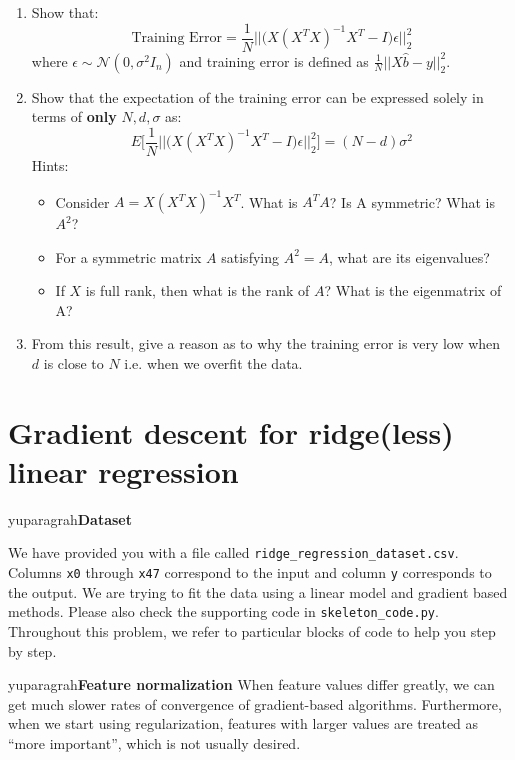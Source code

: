 \documentclass{article}
\begin{document}
\begin{enumerate}
  
  \item Show that: 
    $$
    \textrm{Training Error} = \frac{1}{N} \Big|\Big| \Big( X(X^TX)^{-1}X^T - I \Big) \epsilon \Big| \Big|^2_2
    $$
    where $\epsilon \sim \mathcal{N}(0, \sigma^2 I_n)$ and training error is defined as $\frac{1}{N}||X\hat{b} - y||_2^2$. 

  \item Show that the expectation of the training error can be expressed solely in terms of \textbf{only} $N, d, \sigma$ as:
  $$
  E \Big[ \frac{1}{N} \Big|\Big| \Big( X(X^TX)^{-1}X^T - I \Big) \epsilon \Big| \Big|^2_2 \Big] = (N-d)\sigma^2
  $$ 
  Hints:
  \begin{itemize}
    \item Consider $A = X(X^TX)^{-1}X^T$. What is $A^TA$? Is A symmetric? What is $A^2$?
    \item For a symmetric matrix $A$ satisfying $A^2 = A$, what are its eigenvalues? 
    \item If $X$ is full rank, then what is the rank of $A$? What is the eigenmatrix of A?
  \end{itemize}
  
  \item From this result, give a reason as to why the training error is very low when $d$ is close to $N$ i.e. when we overfit the data. 
   
\setcounter{saveenum}{\value{enumi}}
\end{enumerate}

\section{\large Gradient descent for ridge(less) linear regression}

yuparagrah{\bf Dataset} 

We have provided you with a file called \texttt{ridge\_regression\_dataset.csv}. Columns \texttt{x0} through \texttt{x47} correspond to the input and column \texttt{y} corresponds to the output. We are trying to fit the data using a linear model and gradient based methods. Please also check the supporting code in \texttt{skeleton\_code.py}. Throughout this problem, we refer to particular blocks of code to help you step by step. 


yuparagrah{\bf Feature normalization}
When feature values differ greatly, we can get much slower rates of
convergence of gradient-based algorithms. Furthermore, when we start
using regularization, features with
larger values are treated as ``more important'', which is not usually
desired.  
\end{document}
